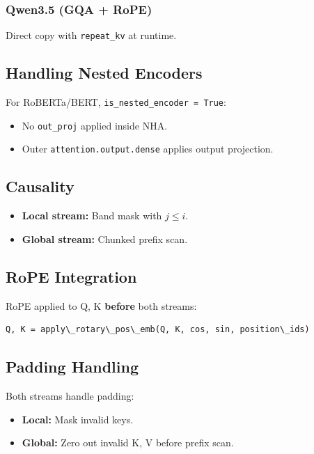 \subsubsection{Qwen3.5 (GQA + RoPE)}

Direct copy with \texttt{repeat\_kv} at runtime.

\subsection{Handling Nested Encoders}

For RoBERTa/BERT, \texttt{is\_nested\_encoder = True}:
\begin{itemize}
\item No \texttt{out\_proj} applied inside NHA.
\item Outer \texttt{attention.output.dense} applies output projection.

\end{itemize}
\subsection{Causality}

\begin{itemize}
\item \textbf{Local stream:} Band mask with $j \le i$.
\item \textbf{Global stream:} Chunked prefix scan.

\end{itemize}
\subsection{RoPE Integration}

RoPE applied to Q, K \textbf{before} both streams:

\begin{lstlisting}
Q, K = apply\_rotary\_pos\_emb(Q, K, cos, sin, position\_ids)
\end{lstlisting}

\subsection{Padding Handling}

Both streams handle padding:
\begin{itemize}
\item \textbf{Local:} Mask invalid keys.
\item \textbf{Global:} Zero out invalid K, V before prefix scan.

\end{itemize}
